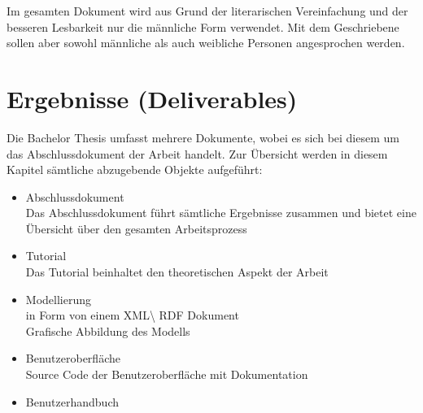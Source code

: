 Im gesamten Dokument wird aus Grund der literarischen Vereinfachung und der besseren Lesbarkeit nur die männliche Form verwendet. Mit dem Geschriebene sollen aber sowohl männliche als auch weibliche Personen angesprochen werden.

\section{Ergebnisse (Deliverables)}
\label{sec:admin_ergebniss}
Die Bachelor Thesis umfasst mehrere Dokumente, wobei es sich bei diesem um das Abschlussdokument der Arbeit handelt. Zur Übersicht werden in diesem Kapitel sämtliche abzugebende Objekte aufgeführt:
\begin{itemize}
	\item Abschlussdokument\\ Das Abschlussdokument führt sämtliche Ergebnisse zusammen und bietet eine Übersicht über den gesamten Arbeitsprozess
	\item Tutorial\\ Das Tutorial beinhaltet den theoretischen Aspekt der Arbeit
	\item Modellierung \\in Form von einem XML\textbackslash{} RDF Dokument\\ Grafische Abbildung des Modells
	\item Benutzeroberfläche\\ Source Code der Benutzeroberfläche mit Dokumentation
	\item Benutzerhandbuch 
\end{itemize}
